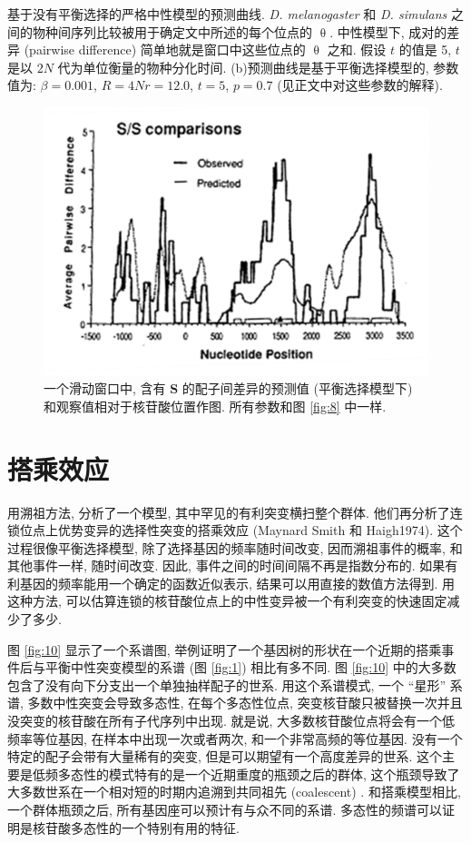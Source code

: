\documentclass[12pt]{article}
\begin{document}
基于没有平衡选择的严格中性模型的预测曲线. \textit{D. melanogaster} 和 \textit{D. simulans}
之间的物种间序列比较被用于确定文中所述的每个位点的 $\uptheta$.
中性模型下, 成对的差异 (pairwise difference) 简单地就是窗口中这些位点的 $\uptheta$ 之和.
假设 $t$ 的值是 5, $t$ 是以 $2N$ 代为单位衡量的物种分化时间.
(b)预测曲线是基于平衡选择模型的, 参数值为: $\beta = 0.001$, $R = 4Nr = 12.0$, $t=5$, $p=0.7$
(见正文中对这些参数的解释).

\begin{figure}
    \centering
    \includegraphics{coalescent-process.images/image9.png}
    \caption{
        一个滑动窗口中, 含有 \textbf{S} 的配子间差异的预测值 (平衡选择模型下) 和观察值相对于核苷酸位置作图.
        所有参数和图 \ref{fig:8} 中一样.
    }
    \label{fig:9}
\end{figure}

\section{搭乘效应}

用溯祖方法, \textcite{kaplan1989} 分析了一个模型, 其中罕见的有利突变横扫整个群体.
他们再分析了连锁位点上优势变异的选择性突变的搭乘效应 (Maynard Smith 和 Haigh1974).
这个过程很像平衡选择模型, 除了选择基因的频率随时间改变, 因而溯祖事件的概率, 和其他事件一样, 随时间改变.
因此, 事件之间的时间间隔不再是指数分布的.
如果有利基因的频率能用一个确定的函数近似表示, 结果可以用直接的数值方法得到.
用这种方法, 可以估算连锁的核苷酸位点上的中性变异被一个有利突变的快速固定减少了多少.

图 \ref{fig:10} 显示了一个系谱图, 举例证明了一个基因树的形状在一个近期的搭乘事件后与平衡中性突变模型的系谱 (图
\ref{fig:1}) 相比有多不同.
图 \ref{fig:10} 中的大多数包含了没有向下分支出一个单独抽样配子的世系.
用这个系谱模式, 一个 ``星形'' 系谱, 多数中性突变会导致多态性, 在每个多态性位点,
突变核苷酸只被替换一次并且没突变的核苷酸在所有子代序列中出现.
就是说, 大多数核苷酸位点将会有一个低频率等位基因, 在样本中出现一次或者两次, 和一个非常高频的等位基因.
没有一个特定的配子会带有大量稀有的突变, 但是可以期望有一个高度差异的世系.
这个主要是低频多态性的模式特有的是一个近期重度的瓶颈之后的群体,
这个瓶颈导致了大多数世系在一个相对短的时期内追溯到共同祖先 (coalescent) .
和搭乘模型相比, 一个群体瓶颈之后, 所有基因座可以预计有与众不同的系谱.
多态性的频谱可以证明是核苷酸多态性的一个特别有用的特征.
\end{document}
